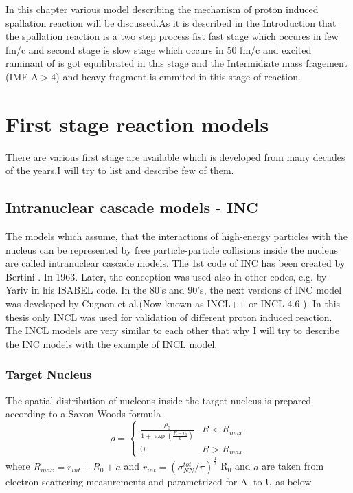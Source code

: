 In this chapter various model describing the mechanism of proton induced spallation reaction will be discussed.As it is described in the Introduction that the spallation reaction is a two step process fist fast stage which occures in few fm/c and second stage is slow stage which occurs in 50 fm/c and excited raminant of is got equilibrated in this stage and the Intermidiate mass fragement (IMF A$>$4) and heavy fragment is emmited in this stage of reaction.
\section{First stage reaction models}
There are various first stage are available which is developed from many decades of the years.I will try to list and describe few of them. 
\subsection{Intranuclear cascade models - INC}
The models which assume, that the interactions of high-energy particles with the nucleus can be represented by free particle-particle collisions inside the nucleus are called intranuclear cascade models. The 1st code of INC has been created by Bertini . In 1963. Later, the conception was used also in other codes, e.g. by Yariv in his ISABEL code. 
In the 80's and 90's, the next versions of INC model was developed by Cugnon et al.(Now known as INCL++ or INCL 4.6 ).
In this thesis only INCL was used for validation of different proton induced reaction. The INCL models are very similar to each other that why I will try to describe the INC models with the example of INCL model.
\subsubsection{Target Nucleus}
The spatial distribution of nucleons inside the target nucleus is prepared according to a Saxon-Woods formula\\
\begin{equation}\label{key}
\rho= \begin{cases} \frac{\rho_{0}}{1+\exp(\frac{R-r_{0}}{a})} &  R<R_{max}\\ 
0 &  R> R_{max} \end{cases} 
\end{equation}
where $R_{max}=r_{int} + R_{0} + a$ and $r_{int}=(\sigma_{NN}^{tot}/\pi)^\frac{1}{2}$
R$_{0}$ and $a$ are taken from electron scattering measurements and parametrized for Al to U as below

